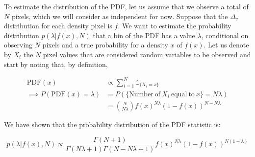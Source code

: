 To estimate the distribution of the PDF, let us assume that we observe a total of $N$ pixels, which we will consider as independent for now. Suppose that the $\Delta_\tau$ distribution for each density pixel is $f$. We want to estimate the probability distribution $p(\lambda |f(x), N )$ that a bin of the PDF has a value $\lambda$, conditional on observing $N$ pixels and a true probability for a density $x$ of $f(x)$. Let us denote by $X_i$ the $N$ pixel values that are considered random variables to be observed and start by noting that, by definition,

\begin{align}
    \mathrm{PDF} (x)& \propto \sum_{i=1}^N \mathds{1}_{\{X_i=x \}}\\
    \implies P(\mathrm{PDF}(x)=\lambda)&=P(\{ \mathrm{Number\ of\ } X_i \mathrm{\ equal\ to\ } x\}=N\lambda)\\
    &= \binom{N}{N\lambda}f(x)^{N\lambda}(1-f(x))^{N-N\lambda}
\end{align}





We have shown that the probability distribution of the PDF statistic is:

\begin{equation}\label{eq:PDF of PDF}
    p(\lambda |f(x),N )\propto \frac{\Gamma(N+1)}{\Gamma(N\lambda+1)\Gamma(N-N\lambda+1)} f(x)^{N\lambda}(1-f(x))^{N(1-\lambda)}
\end{equation}

